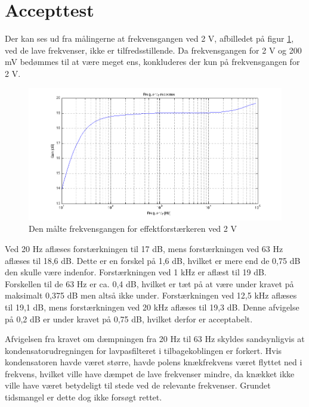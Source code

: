 \section{Accepttest}
Der kan ses ud fra målingerne at frekvensgangen ved 2 V, afbilledet på figur \ref{fig:acceff:frek2v}, ved de lave frekvenser, ikke er tilfredsstillende. Da frekvensgangen for 2 V og 200 mV bedømmes til at være meget ens, konkluderes der kun på frekvensgangen for 2 V.

\begin{figure}[h]
\centering
\includegraphics[width=\textwidth]{maalerapporter/effektforstaerker/2V-45mA-uden-modstand-frek.png}
\caption{Den målte frekvensgangen for effektforstærkeren ved 2 V}
\label{fig:acceff:frek2v}
\end{figure}

Ved 20 Hz aflæses forstærkningen til 17 dB, mens forstærkningen ved 63 Hz aflæses til 18,6 dB. Dette er en forskel på 1,6 dB, hvilket er mere end de 0,75 dB den skulle være indenfor. Forstærkningen ved 1 kHz er aflæst til 19 dB. Forskellen til de 63 Hz er ca. 0,4 dB, hvilket er tæt på at være under kravet på maksimalt 0,375 dB men altså ikke under. Forstærkningen ved 12,5 kHz aflæses til 19,1 dB, mens forstærkningen ved 20 kHz aflæses til 19,3 dB. Denne afvigelse på 0,2 dB er under kravet på 0,75 dB, hvilket derfor er acceptabelt.

Afvigelsen fra kravet om dæmpningen fra 20 Hz til 63 Hz skyldes sandsynligvis at kondensatorudregningen for lavpasfilteret i tilbagekoblingen er forkert. Hvis kondensatoren havde været større, havde polens knækfrekvens været flyttet ned i frekvens, hvilket ville have dæmpet de lave frekvenser mindre, da knækket ikke ville have været betydeligt til stede ved de relevante frekvenser. Grundet tidsmangel er dette dog ikke forsøgt rettet.

